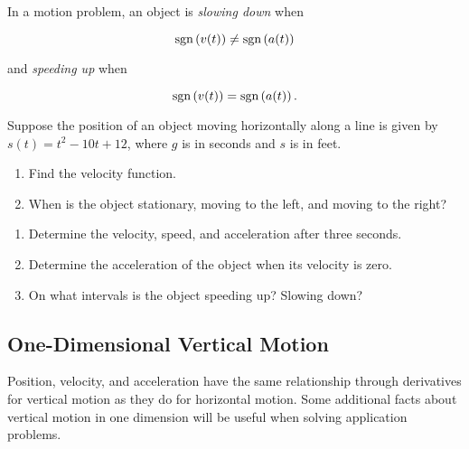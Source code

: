 \documentclass[12pt]{article}
\begin{document}
In a motion problem, an object is \textit{slowing down} when 

$$\text{sgn}\left( v(t)\right) \neq \text{sgn}\left( a(t)\right)$$

and \textit{speeding up} when

$$\text{sgn}\left( v(t)\right) = \text{sgn}\left( a(t)\right).$$

\vspace{3mm}

\Example Suppose the position of an object moving horizontally along a line is given by $s(t)=t^2-10t+12$, where $g$ is in seconds and $s$ is in feet.

\begin{enumerate}
\item[\tc{1}] Find the velocity function.

\vspace{30mm}

\item[\tc{2}] When is the object stationary, moving to the left, and moving to the right?

\vspace{30mm}
\end{enumerate}

\newpage

\ExampleCont
\begin{enumerate}

\item[\tc{3}] Determine the velocity, speed, and acceleration after three seconds.

\vspace{30mm}

\item[\tc{4}] Determine the acceleration of the object when its velocity is zero.

\vspace{30mm}

\item[\tc{5}] On what intervals is the object speeding up? Slowing down?

\vspace{40mm}

\end{enumerate}

\subsection*{One-Dimensional Vertical Motion}

Position, velocity, and acceleration have the same relationship through derivatives for vertical motion as they do for horizontal motion. Some additional facts about vertical motion in one dimension will be useful when solving application problems.
\end{document}
